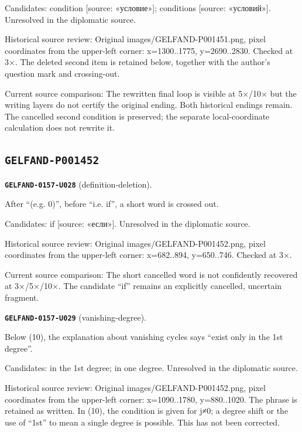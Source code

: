 Candidates: condition [source: «условие»]; conditions [source: «условий»]. Unresolved in the diplomatic source.\par
Historical source review: Original images/GELFAND-P001451.png, pixel coordinates from the upper-left corner: x=1300..1775, y=2690..2830. Checked at 3×. The deleted second item is retained below, together with the author’s question mark and crossing-out.\par
Current source comparison: The rewritten final loop is visible at 5×/10× but the writing layers do not certify the original ending. Both historical endings remain. The cancelled second condition is preserved; the separate local-coordinate calculation does not rewrite it.\par\medskip
\subsection*{\texttt{GELFAND-P001452}}
\par\noindent\leavevmode{}\label{GELFAND-0157-U028}\label{GELFAND-P001452:definition-deletion}\textbf{\texttt{GELFAND-0157-U028}} (definition-deletion).\nopagebreak[4]\par
After “(e.g. 0)”, before “i.e. if”, a short word is crossed out.\par
Candidates: if [source: «если»]. Unresolved in the diplomatic source.\par
Historical source review: Original images/GELFAND-P001452.png, pixel coordinates from the upper-left corner: x=682..894, y=650..746. Checked at 3×.\par
Current source comparison: The short cancelled word is not confidently recovered at 3×/5×/10×. The candidate “if” remains an explicitly cancelled, uncertain fragment.\par\medskip
\par\noindent\leavevmode{}\label{GELFAND-0157-U029}\label{GELFAND-P001452:vanishing-degree}\textbf{\texttt{GELFAND-0157-U029}} (vanishing-degree).\nopagebreak[4]\par
Below (10), the explanation about vanishing cycles says “exist only in the 1st degree”.\par
Candidates: in the 1st degree; in one degree. Unresolved in the diplomatic source.\par
Historical source review: Original images/GELFAND-P001452.png, pixel coordinates from the upper-left corner: x=1090..1780, y=880..1020. The phrase is retained as written. In (10), the condition is given for j≠0; a degree shift or the use of “1st” to mean a single degree is possible. This has not been corrected.\par
